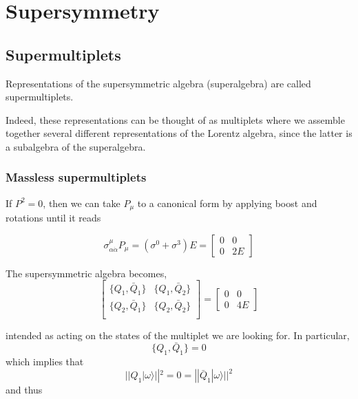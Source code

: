 \chapter{Supersymmetry}
\section{Supermultiplets}

\begin{definition}[Supermultiplet]
  Representations of the supersymmetric algebra (superalgebra) are called
  supermultiplets.
\end{definition}

Indeed, these representations can be thought of as multiplets where we assemble
together several different representations of the Lorentz algebra, since the
latter is a subalgebra of the superalgebra.

\subsection{Massless supermultiplets}
If $P^2=0$, then we can take $P_\mu$ to a canonical form by applying boost and
rotations until it reads

\begin{equation}
  \sigma^{\mu}_{\alpha\dot{\alpha}}P_\mu = \left(\sigma^0+\sigma^3\right)E = 
  \begin{bmatrix}
    0 & 0\\
    0 & 2E
  \end{bmatrix}
\end{equation}

The supersymmetric algebra becomes,
\begin{equation}
  \begin{bmatrix}
    \{Q_1,\bar{Q}_{\dot{1}}\} & \{Q_1,\bar{Q}_{\dot{2}}\} \\

    \{Q_2,\bar{Q}_{\dot{1}}\} & \{Q_2,\bar{Q}_{\dot{2}}\} \\

  \end{bmatrix}
  =
  \begin{bmatrix}
    0 & 0\\
    0 & 4E
  \end{bmatrix}
\end{equation}

intended as acting on the states of the multiplet we are looking for. In
particular,
\begin{equation}
\{Q_1, \bar{Q}_{\dot{1}}\} = 0
\end{equation}
which implies that 
\begin{equation}
  ||Q_1|\omega\rangle||^2 = 0 = ||\bar{Q}_{\dot{1}}|\omega\rangle||^2
\end{equation}
and thus

